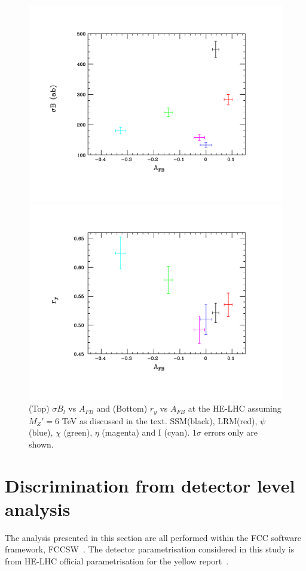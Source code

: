 \documentclass[14pt]{article}
\begin{document}
\begin{figure}[htbp]
\centerline{\includegraphics[width=5.0in,angle=0]{figures/compare2.pdf}}
\vspace*{-2.5cm}
\centerline{\includegraphics[width=5.0in,angle=0]{figures/compare3.pdf}}
\vspace*{-1.30cm}
\caption{(Top) $\sigma B_l$ vs $A_{FB}$ and (Bottom) $r_y$ vs $A_{FB}$ at the HE-LHC assuming $M_Z'=6$ TeV as discussed in the text. 
SSM(black), LRM(red), $\psi$ (blue), $\chi$ (green), $\eta$ (magenta) and I (cyan). $1\sigma$ errors only are shown. }
\label{toy3}
\end{figure}




\section{Discrimination from detector level analysis}
The analysis presented in this section are all performed within the FCC software framework, FCCSW~\cite{fccsw}.
The detector parametrisation considered in this study is from HE-LHC official parametrisation for the yellow report~\cite{HELHCtwiki}.
\end{document}
